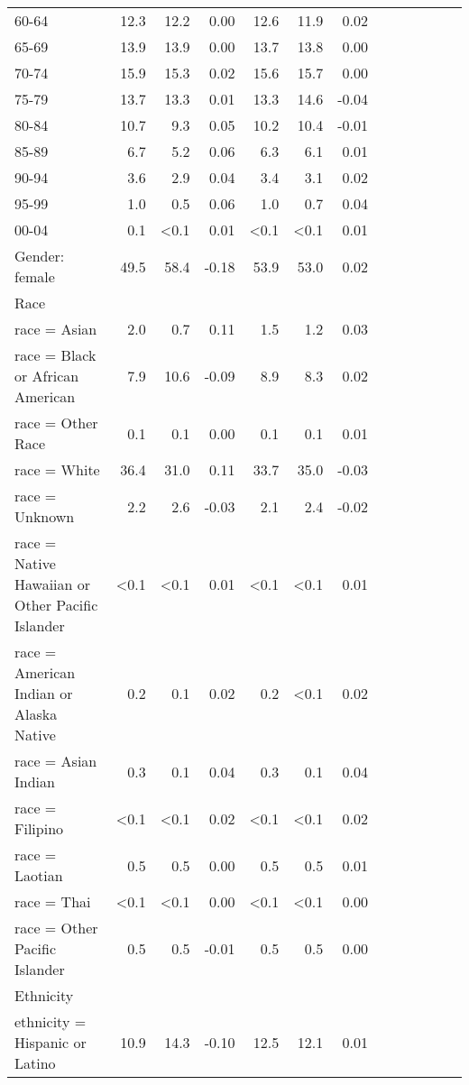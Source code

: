 \documentclass[11pt,]{article}
\begin{document}
\begin{longtable}{lrrrrrrrrrrrr}
      60-64 & 12.3 & 12.2 &  0.00 & 12.6 & 11.9 &  0.02 \\ 
      65-69 & 13.9 & 13.9 &  0.00 & 13.7 & 13.8 &  0.00 \\ 
      70-74 & 15.9 & 15.3 &  0.02 & 15.6 & 15.7 &  0.00 \\ 
      75-79 & 13.7 & 13.3 &  0.01 & 13.3 & 14.6 & -0.04 \\ 
      80-84 & 10.7 &  9.3 &  0.05 & 10.2 & 10.4 & -0.01 \\ 
      85-89 &  6.7 &  5.2 &  0.06 &  6.3 &  6.1 &  0.01 \\ 
      90-94 &  3.6 &  2.9 &  0.04 &  3.4 &  3.1 &  0.02 \\ 
      95-99 &  1.0 &  0.5 &  0.06 &  1.0 &  0.7 &  0.04 \\ 
      00-04 &  0.1 & <0.1 &  0.01 & <0.1 & <0.1 &  0.01 \\ 
  Gender: female & 49.5 & 58.4 & -0.18 & 53.9 & 53.0 &  0.02 \\ 
  Race &    &    &     &    &    &     \\ 
      race = Asian &  2.0 &  0.7 &  0.11 &  1.5 &  1.2 &  0.03 \\ 
      race = Black or African American &  7.9 & 10.6 & -0.09 &  8.9 &  8.3 &  0.02 \\ 
      race = Other Race &  0.1 &  0.1 &  0.00 &  0.1 &  0.1 &  0.01 \\ 
      race = White & 36.4 & 31.0 &  0.11 & 33.7 & 35.0 & -0.03 \\ 
      race = Unknown &  2.2 &  2.6 & -0.03 &  2.1 &  2.4 & -0.02 \\ 
      race = Native Hawaiian or Other Pacific Islander & <0.1 & <0.1 &  0.01 & <0.1 & <0.1 &  0.01 \\ 
      race = American Indian or Alaska Native &  0.2 &  0.1 &  0.02 &  0.2 & <0.1 &  0.02 \\ 
      race = Asian Indian &  0.3 &  0.1 &  0.04 &  0.3 &  0.1 &  0.04 \\ 
      race = Filipino & <0.1 & <0.1 &  0.02 & <0.1 & <0.1 &  0.02 \\ 
      race = Laotian &  0.5 &  0.5 &  0.00 &  0.5 &  0.5 &  0.01 \\ 
      race = Thai & <0.1 & <0.1 &  0.00 & <0.1 & <0.1 &  0.00 \\ 
      race = Other Pacific Islander &  0.5 &  0.5 & -0.01 &  0.5 &  0.5 &  0.00 \\ 
  Ethnicity &    &    &     &    &    &     \\ 
      ethnicity = Hispanic or Latino & 10.9 & 14.3 & -0.10 & 12.5 & 12.1 &  0.01 \\ 

\end{longtable}
\end{document}
